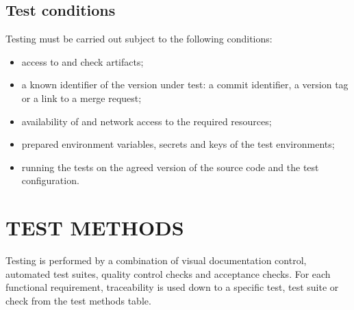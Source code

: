 \documentclass[12pt,a4paper]{extarticle}
\begin{document}
\subsection{Test conditions}

\begin{hseExample}
Testing must be carried out subject to the following conditions:

\begin{itemize}[leftmargin=1.25cm]
    \item access to  and check artifacts;
    \item a known identifier of the version under test: a commit identifier, a version tag or a link to a merge request;
    \item availability of  and network access to the required resources;
    \item prepared environment variables, secrets and keys of the test environments;
    \item running the tests on the agreed version of the source code and the test configuration.
\end{itemize}
\end{hseExample}

\clearpage

\section{TEST METHODS}
\label{sec:methods}

\begin{hseExample}
Testing is performed by a combination of visual documentation control, automated test suites, quality control checks and acceptance checks. For each functional requirement, traceability is used down to a specific test, test suite or check from the test methods table.
\end{hseExample}

\end{document}
